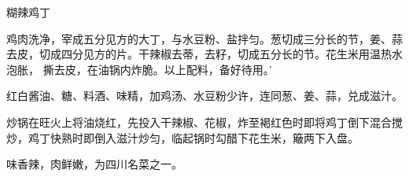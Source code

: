 \begin{recipe}[宫保鸡丁]{糊辣鸡丁}

\ingredients


\preparation

\step 鸡肉洗净，宰成五分见方的大丁，与水豆粉、盐拌匀。葱切成三分长的节，姜、蒜
去皮，切成四分见方的片。干辣椒去蒂，去籽，切成五分长的节。花生米用温热水泡胀，
撕去皮，在油锅内炸脆。以上配料，备好待用。’

\step 红白酱油、糖、料酒、味精，加鸡汤、水豆粉少许，连同葱、姜、蒜，兑成滋汁。

\step 炒锅在旺火上将油烧红，先投入干辣椒、花椒，炸至褐红色时即将鸡丁倒下混合搅
炒，鸡丁快熟时即倒入滋汁炒匀，临起锅时勾醋下花生米，簸两下入盘。

\features

味香辣，肉鲜嫩，为四川名菜之一。

\end{recipe}

